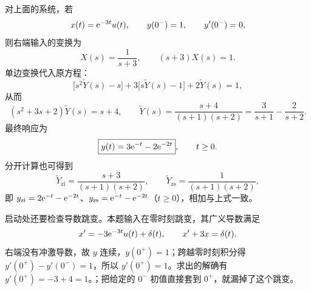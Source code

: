 \begin{example}[带初始状态的系统响应]
\label{eg:laplace-nonzero-initial-state}
  对上面的系统，若
  \[
    x(t)=\mathrm{e}^{-3t}u(t),\qquad
    y(0^-)=1,\qquad y'(0^-)=0,
  \]
  则右端输入的变换为
  \[
    X(s)=\frac{1}{s+3},\qquad
    (s+3)X(s)=1.
  \]
  单边变换代入原方程：
  \[
    \bigl[s^2\widetilde Y(s)-s\bigr]
    +3\bigl[s\widetilde Y(s)-1\bigr]
    +2\widetilde Y(s)=1,
  \]
  从而
  \[
    (s^2+3s+2)\widetilde Y(s)=s+4,
    \qquad
    \widetilde Y(s)=\frac{s+4}{(s+1)(s+2)}
    =\frac{3}{s+1}-\frac{2}{s+2}.
  \]
  最终响应为
  \[
    \boxed{y(t)=3\mathrm{e}^{-t}-2\mathrm{e}^{-2t}},\qquad t\geq0.
  \]
  分开计算也可得到
  \[
    \widetilde Y_{\mathrm{zi}}=\frac{s+3}{(s+1)(s+2)},\qquad
    \widetilde Y_{\mathrm{zs}}=\frac{1}{(s+1)(s+2)},
  \]
  即 $y_{\mathrm{zi}}=2\mathrm{e}^{-t}-\mathrm{e}^{-2t}$、$y_{\mathrm{zs}}=\mathrm{e}^{-t}-\mathrm{e}^{-2t}$（$t\geq0$），相加与上式一致。

  启动处还要检查导数跳变。本题输入在零时刻跳变，其广义导数满足
  \[
    x'=-3\mathrm{e}^{-3t}u(t)+\delta(t),
    \qquad x'+3x=\delta(t).
  \]
  右端没有冲激导数，故 $y$ 连续，$y(0^+)=1$；跨越零时刻积分得 $y'(0^+)-y'(0^-)=1$，所以 $y'(0^+)=1$。求出的解确有 $y'(0^+)=-3+4=1$。；把给定的 $0^-$ 初值直接套到 $0^+$，就漏掉了这个跳变。
\end{example}

\endgroup
